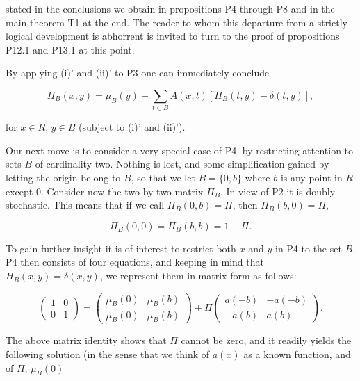 stated in the conclusions we obtain in propositions P4 through P8 and in the main theorem T1 at the end. The reader to whom this departure from a strictly logical development is abhorrent is invited to turn to the proof of propositions P12.1 and P13.1 at this point.

By applying (i)' and (ii)' to P3 one can immediately conclude

$$H_B(x,y) = \mu_B(y) + \sum_{t \in B} A(x,t)[\Pi_B(t,y) - \delta(t,y)],$$

for $x \in R$, $y \in B$ (subject to (i)' and (ii)').

Our next move is to consider a very special case of P4, by restricting attention to sets $B$ of cardinality two. Nothing is lost, and some simplification gained by letting the origin belong to $B$, so that we let $B = \{0,b\}$ where $b$ is any point in $R$ except 0. Consider now the two by two matrix $\Pi_B$. In view of P2 it is doubly stochastic. This means that if we call $\Pi_B(0,b) = \Pi$, then $\Pi_B(b,0) = \Pi$,

$$\Pi_B(0,0) = \Pi_B(b,b) = 1 - \Pi.$$

To gain further insight it is of interest to restrict both $x$ and $y$ in P4 to the set $B$. P4 then consists of four equations, and keeping in mind that $H_B(x,y) = \delta(x,y)$, we represent them in matrix form as follows:

$$\begin{pmatrix} 1 & 0 \\ 0 & 1 \end{pmatrix} = \begin{pmatrix} \mu_B(0) & \mu_B(b) \\ \mu_B(0) & \mu_B(b) \end{pmatrix} + \Pi \begin{pmatrix} a(-b) & -a(-b) \\ -a(b) & a(b) \end{pmatrix}.$$

The above matrix identity shows that $\Pi$ cannot be zero, and it readily yields the following solution (in the sense that we think of $a(x)$ as a known function, and of $\Pi$, $\mu_B(0)$